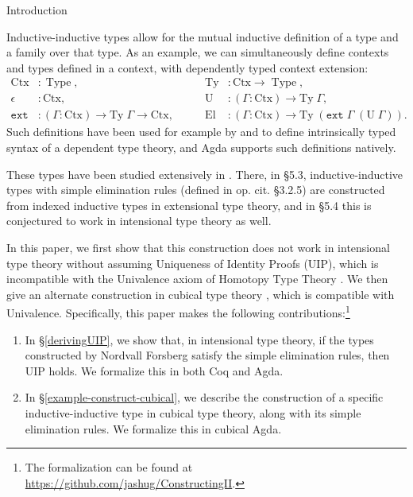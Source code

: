 \documentclass[runningheads]{llncs}
\DeclareMathOperator{\USet}{Type}
\newcommand{\join}{\texttt{ext}}
\def\Forsberg/{Nordvall Forsberg}
\begin{document}
\begin{section}{Introduction}
    
Inductive-inductive types allow for the mutual inductive definition of a type and a family over that type. As an example,
we can simultaneously define contexts and types defined in a context, with dependently typed context extension:
\begin{align*}
\text{Ctx} &: \USet,\qquad
&\text{Ty} &: \text{Ctx} \to \USet,\\
\epsilon &: \text{Ctx},\qquad
&\text{U} &: (\Gamma : \text{Ctx}) \to \text{Ty}\;\Gamma,\\
\join &: (\Gamma : \text{Ctx}) \to \text{Ty}\; \Gamma \to \text{Ctx},\qquad
&\text{El} &: (\Gamma : \text{Ctx}) \to \text{Ty}\;(\join\;\Gamma\;(\text{U}\;\Gamma)).
\end{align*}
Such definitions have been used for example by \citet{danielssonIRdeptype} and \citet{CHAPMAN200921} to define intrinsically typed syntax of a dependent type theory, and Agda supports such definitions natively.

These types have been studied extensively in \citet{nordvallforsberg2013thesis}. There, in \S5.3, inductive-inductive types with simple elimination rules (defined in op. cit. \S3.2.5) are constructed from indexed inductive types in extensional type theory, and in \S5.4 this is conjectured to work in intensional type theory as well.

In this paper, we first show that this construction does not work in intensional type theory without assuming Uniqueness of Identity Proofs (UIP), which is incompatible with the Univalence axiom of Homotopy Type Theory \citep{hottbook}. We then give an alternate construction in cubical type theory \citep{cubicaltt_ifcolog}, which is compatible with Univalence.
Specifically, this paper makes the following contributions:\footnote{The formalization can be found at \url{https://github.com/jashug/ConstructingII}.}
\begin{enumerate}
    \item In \S\ref{derivingUIP}, we show that, in intensional type theory, if the types constructed by \Forsberg/ satisfy the simple elimination rules, then UIP holds. We formalize this in both Coq and Agda.
    \item In \S\ref{example-construct-cubical}, we describe the construction of a specific inductive-inductive type in cubical type theory, along with its simple elimination rules. We formalize this in cubical Agda.
\end{enumerate}


\end{section}
\end{document}
